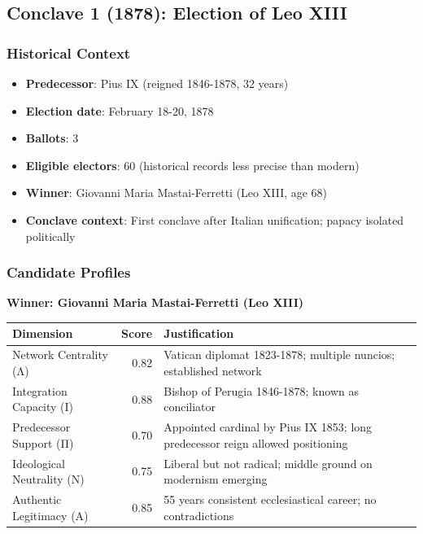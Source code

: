 \documentclass[11pt,a4paper]{article}
\begin{document}
\subsection{Conclave 1 (1878): Election of Leo XIII}

\subsubsection{Historical Context}

\begin{itemize}
    \item \textbf{Predecessor}: Pius IX (reigned 1846-1878, 32 years)
    \item \textbf{Election date}: February 18-20, 1878
    \item \textbf{Ballots}: 3
    \item \textbf{Eligible electors}: 60 (historical records less precise than modern)
    \item \textbf{Winner}: Giovanni Maria Mastai-Ferretti (Leo XIII, age 68)
    \item \textbf{Conclave context}: First conclave after Italian unification; papacy isolated politically
\end{itemize}

\subsubsection{Candidate Profiles}

\textbf{Winner: Giovanni Maria Mastai-Ferretti (Leo XIII)}

\begin{center}
\begin{tabular}{lrp{4cm}}
\toprule
\textbf{Dimension} & \textbf{Score} & \textbf{Justification} \\
\midrule
Network Centrality (Λ) & 0.82 & Vatican diplomat 1823-1878; multiple nuncios; established network \\
Integration Capacity (Ι) & 0.88 & Bishop of Perugia 1846-1878; known as conciliator \\
Predecessor Support (Π) & 0.70 & Appointed cardinal by Pius IX 1853; long predecessor reign allowed positioning \\
Ideological Neutrality (Ν) & 0.75 & Liberal but not radical; middle ground on modernism emerging \\
Authentic Legitimacy (Α) & 0.85 & 55 years consistent ecclesiastical career; no contradictions \\
\bottomrule
\end{tabular}
\end{center}
\end{document}
